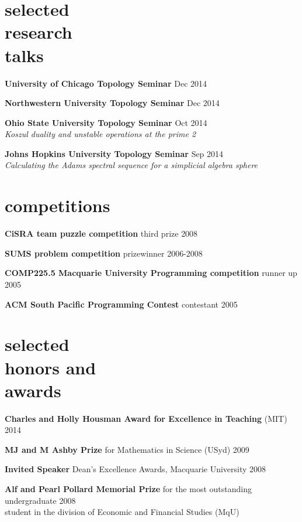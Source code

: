 \documentclass[margin,line]{resume}
\newcommand{\whitetab}{\makebox[1cm][r]{ }}
\newcommand{\CVsection}[1]{\section{\mysidestyle #1}}
\newcommand{\entry}[3]{\textbf{#1} #2 \hfill {#3}
           
\vspace{-3.4mm}}
\newcommand{\twolineentry}[4]{\textbf{#1} #2 \hfill {#4}\\%
#3
           
\vspace{-3.4mm}}
\newcommand{\FINALentry}[3]{\textbf{#1} #2 \hfill {#3}\\\vspace{-.55cm}}
\newcommand{\FINALtwolineentry}[4]{\textbf{#1} #2 \hfill {#4}\\%
#3\\\vspace{-.55cm}}
\begin{document}
\begin{resume}
\CVsection{selected\\research\\talks}
\entry{University of Chicago Topology Seminar}{}{Dec 2014}%
\entry{Northwestern University Topology Seminar}{}{Dec 2014}%
\twolineentry{Ohio State University Topology Seminar}{}{\whitetab \emph{Koszul duality and unstable operations at the prime 2}}{Oct 2014}%
\FINALtwolineentry{Johns Hopkins University Topology Seminar}{}{\whitetab \emph{Calculating the Adams spectral sequence for a simplicial algebra sphere}}{Sep 2014}%

\CVsection{competitions}
\entry{CiSRA team puzzle competition}{third prize}{2008}
\entry{SUMS problem competition}{prizewinner}{2006-2008}%
\entry{COMP225.5 Macquarie University Programming competition}{runner up}{2005}
\FINALentry{ACM South Pacific Programming Contest}{contestant}{2005}

\CVsection{selected\\honors and\\awards} 
\entry{Charles and Holly Housman Award for Excellence in Teaching}{(MIT)}{2014}
\entry{MJ and M Ashby Prize}{for Mathematics in Science (USyd)}{2009}
\entry{Invited Speaker}{Dean's Excellence Awards, Macquarie University}{2008}
\FINALtwolineentry{Alf and Pearl Pollard Memorial Prize}{for the most outstanding undergraduate}{student in the division of Economic and Financial Studies (MqU)}{2008}




\end{resume}
\end{document}

